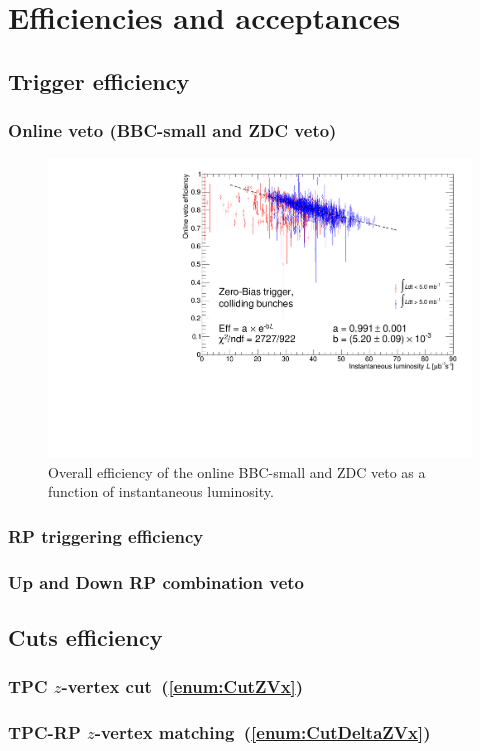 \section{Efficiencies and acceptances}
\subsection{Trigger efficiency}\label{sec:triggerEff}
\subsubsection{Online veto (BBC-small and ZDC veto)}
\begin{figure}[ht!]
\centering%
\includegraphics[width=0.65\linewidth,page=1]{graphics/corrections/OnlineVetoEffVsInstLumi_graph.pdf}%
\caption{Overall efficiency of the online BBC-small and ZDC veto as a function of instantaneous luminosity.}\label{fig:onlineVetoEff}%
\end{figure}
\subsubsection{RP triggering efficiency}
\subsubsection{Up and Down RP combination veto}
\subsection{Cuts efficiency}\label{sec:cutsEff}
\subsubsection{TPC \texorpdfstring{$z$}{z}-vertex cut~(\ref{enum:CutZVx})}
\subsubsection{TPC-RP \texorpdfstring{$z$}{z}-vertex matching~(\ref{enum:CutDeltaZVx})}
